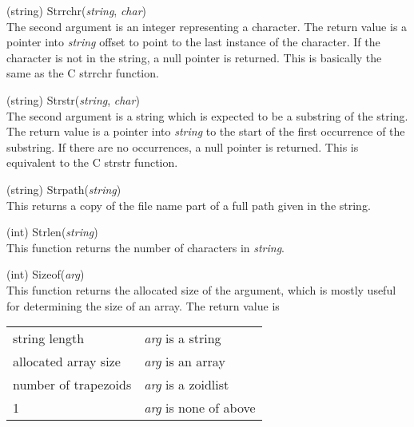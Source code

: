 \begin{description}
\item{(string) \vt Strrchr({\it string\/}, {\it char\/})}\\
The second argument is an integer representing a character.  The
return value is a pointer into {\it string} offset to point to the
last instance of the character.  If the character is not in the
string, a null pointer is returned.  This is basically the same as the
C {\vt strrchr} function.

\item{(string) \vt Strstr({\it string\/}, {\it char\/})}\\
The second argument is a string which is expected to be a substring of
the string.  The return value is a pointer into {\it string} to the
start of the first occurrence of the substring.  If there are no
occurrences, a null pointer is returned.  This is equivalent to the C
{\vt strstr} function.

\item{(string) \vt Strpath({\it string\/})}\\
This returns a copy of the file name part of a full path given in
the string.

\item{(int) \vt Strlen({\it string\/})}\\
This function returns the number of characters in {\it string\/}.

\item{(int) \vt Sizeof({\it arg\/})}\\
This function returns the allocated size of the argument, which is
mostly useful for determining the size of an array.  The return value
is

\begin{tabular}{ll}\\
string length & {\it arg} is a string\\
allocated array size & {\it arg} is an array\\
number of trapezoids & {\it arg} is a zoidlist\\
1 & {\it arg} is none of above\\
\end{tabular}


\end{description}
